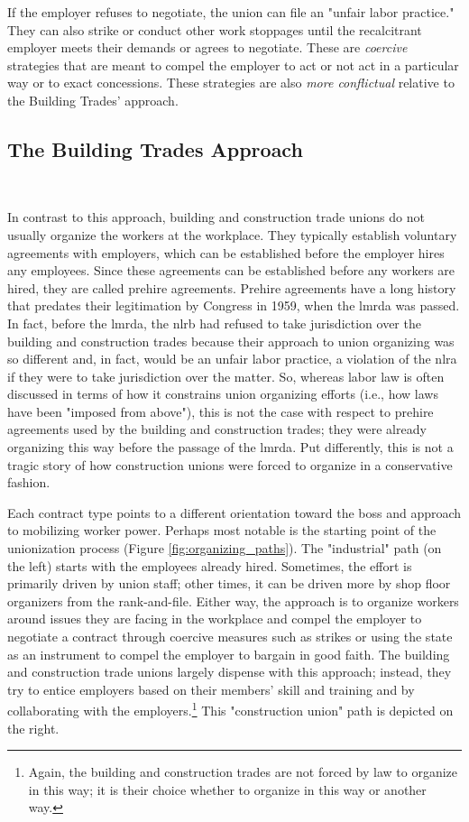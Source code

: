 \documentclass[12pt]{article}
\begin{document}
If the employer refuses to negotiate, the union can file an "unfair labor practice." They can also strike or conduct other work stoppages until the recalcitrant employer meets their demands or agrees to negotiate. These are \textit{coercive} strategies that are meant to compel the employer to act or not act in a particular way or to exact concessions. These strategies are also \textit{more conflictual} relative to the Building Trades' approach.

\subsection{The Building Trades Approach}\label{sub:bt_bargaining}\

In contrast to this approach, building and construction trade unions do not usually organize the workers at the workplace. They typically establish voluntary agreements with employers, which can be established before the employer hires any employees. Since these agreements can be established before any workers are hired, they are called prehire agreements. Prehire agreements have a long history that predates their legitimation by Congress in 1959, when the \acrfull{lmrda} was passed. In fact, before the \acrshort{lmrda}, the \acrshort{nlrb} had refused to take jurisdiction over the building and construction trades because their approach to union organizing was so different and, in fact, would be an unfair labor practice, a violation of the \acrshort{nlra} if they were to take jurisdiction over the matter. So, whereas labor law is often discussed in terms of how it constrains union organizing efforts (i.e., how laws have been "imposed from above"), this is not the case with respect to prehire agreements used by the building and construction trades; they were already organizing this way before the passage of the \acrshort{lmrda}. Put differently, this is not a tragic story of how construction unions were forced to organize in a conservative fashion.

Each contract type points to a different orientation toward the boss and approach to mobilizing worker power. Perhaps most notable is the starting point of the unionization process (Figure \ref{fig:organizing_paths}). The "industrial" path (on the left) starts with the employees already hired. Sometimes, the effort is primarily driven by union staff; other times, it can be driven more by shop floor organizers from the rank-and-file. Either way, the approach is to organize workers around issues they are facing in the workplace and compel the employer to negotiate a contract through coercive measures such as strikes or using the state as an instrument to compel the employer to bargain in good faith. The building and construction trade unions largely dispense with this approach; instead, they try to entice employers based on their members’ skill and training and by collaborating with the employers.\footnote{Again, the building and construction trades are not forced by law to organize in this way; it is their choice whether to organize in this way or another way.} This "construction union" path is depicted on the right.
\end{document}
